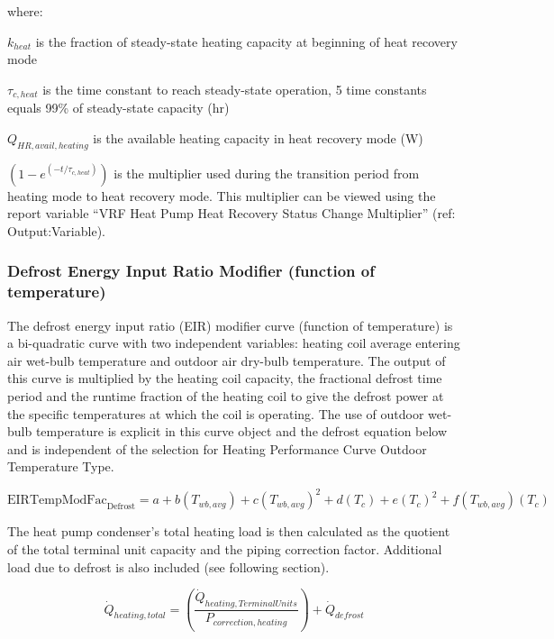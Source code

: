 where:

\(k_{heat}\) is the fraction of steady-state heating capacity at beginning of heat recovery mode

\(\tau_{c,heat}\) is the time constant to reach steady-state operation, 5 time constants equals 99\% of steady-state capacity (hr)

\(Q_{HR,avail,heating}\) is the available heating capacity in heat recovery mode (W)

\(\left( 1 - e^{\left( -t / \tau_{c,heat} \right)} \right)\) is the multiplier used during the transition period from heating mode to heat recovery mode. This multiplier can be viewed using the report variable ``VRF Heat Pump Heat Recovery Status Change Multiplier'' (ref: Output:Variable).

\subsubsection{Defrost Energy Input Ratio Modifier (function of temperature)}\label{defrost-energy-input-ratio-modifier-function-of-temperature}

The defrost energy input ratio (EIR) modifier curve (function of temperature) is a bi-quadratic curve with two independent variables: heating coil average entering air wet-bulb temperature and outdoor air dry-bulb temperature. The output of this curve is multiplied by the heating coil capacity, the fractional defrost time period and the runtime fraction of the heating coil to give the defrost power at the specific temperatures at which the coil is operating. The use of outdoor wet-bulb temperature is explicit in this curve object and the defrost equation below and is independent of the selection for Heating Performance Curve Outdoor Temperature Type.

\begin{equation}
  \mathrm{EIRTempModFac}_{\mathrm{Defrost}} = a + b\left( {{T_{wb,avg}}} \right) + c{\left( {{T_{wb,avg}}} \right)^2} + d\left( {{T_c}} \right) + e{\left( {{T_c}} \right)^2} + f\left( {{T_{wb,avg}}} \right)\left( {{T_c}} \right)
\end{equation}

The heat pump condenser's total heating load is then calculated as the quotient of the total terminal unit capacity and the piping correction factor. Additional load due to defrost is also included (see following section).

\begin{equation}
  \dot{Q}_{heating,total} = \left( \frac{\dot{Q}_{heating,TerminalUnits}}{P_{correction,heating}} \right) + \dot{Q}_{defrost}
\end{equation}

